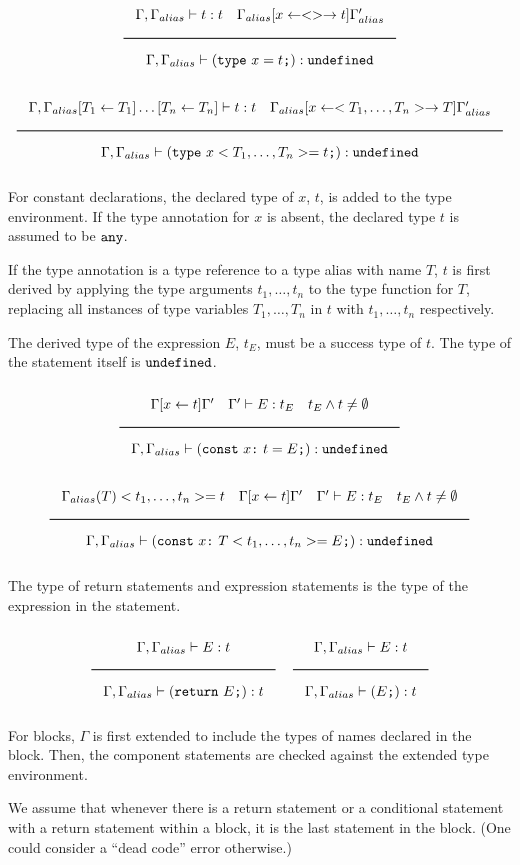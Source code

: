 \noindent
\[
  \Rule{\Gamma, \Gamma_{alias} \vdash t : t \quad \Gamma_{alias} [x \leftarrow <> \rightarrow t] \Gamma_{alias}'
    }{\Gamma, \Gamma_{alias} \vdash (\texttt{type}\ x = t \texttt{;}) : \Undefined}
\]
\noindent
\[
  \Rule{\Gamma, \Gamma_{alias}[T_1 \leftarrow T_1]\ldots[T_n \leftarrow T_n] \vdash t : t \quad
    \Gamma_{alias} [x \leftarrow <T_1, \ldots, T_n> \rightarrow T] \Gamma_{alias}'
    }{\Gamma, \Gamma_{alias} \vdash (\texttt{type}\ x<T_1, \ldots, T_n> = t \texttt{;}) : \Undefined}
\]
\noindent

For constant declarations, the declared type of $x$, $t$, is added to the type environment.
If the type annotation for $x$ is absent, the declared type $t$ is assumed to be $\texttt{any}$.

If the type annotation is a type reference to a type alias with name $T$,
$t$ is first derived by applying the type arguments $t_1, \ldots, t_n$ to the type function for $T$,
replacing all instances of type variables $T_1, \ldots, T_n$ in $t$ with $t_1, \ldots, t_n$ respectively.

The derived type of the expression $E$, $t_E$, must be a success type of $t$.
The type of the statement itself is $\texttt{undefined}$.

\noindent
\[
  \Rule{\Gamma [x \leftarrow t] \Gamma' \quad \Gamma' \vdash E : t_E \quad t_E \wedge t \neq \emptyset}{
    \Gamma, \Gamma_{alias} \vdash (\texttt{const}\ x \texttt{:}\ t = E\texttt{;}) : \Undefined}
\]
\noindent
\[
  \Rule{\Gamma_{alias}(T)<t_1, \ldots, t_n> = t \quad \Gamma [x \leftarrow t] \Gamma' \quad \Gamma' \vdash E : t_E \quad
    t_E \wedge t \neq \emptyset}{\Gamma, \Gamma_{alias} \vdash (\texttt{const}\ x \texttt{:}\ T<t_1, \ldots, t_n> = E\texttt{;}) : \Undefined}
\]
\noindent

The type of return statements and expression statements is the type of the expression in the statement.

\noindent
\[
  \Rule{\Gamma, \Gamma_{alias} \vdash E : t}{\Gamma, \Gamma_{alias} \vdash (\texttt{return}\ E\texttt{;}) : t}
  \quad
  \Rule{\Gamma, \Gamma_{alias} \vdash E : t}{\Gamma, \Gamma_{alias} \vdash (E\texttt{;}) : t}
\]
\noindent

For blocks, $\Gamma$ is first extended to include the types of names declared in the block.
Then, the component statements are checked against the extended type environment.

We assume that whenever there is a return statement or a conditional statement with a return statement within a
block, it is the last statement in the block. (One could consider a ``dead code'' error otherwise.)

